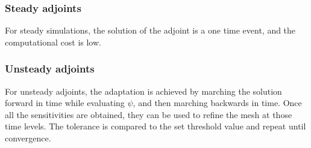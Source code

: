 \subsubsection{Steady adjoints}

For steady simulations, the solution of the adjoint is a one time event, and the computational cost is low.

\subsubsection{Unsteady adjoints}
For unsteady adjoints, the adaptation is achieved by marching the solution forward in time while evaluating $\psi$, and then marching backwards in time. Once all the sensitivities are obtained, they can be used to refine the mesh at those time levels. The tolerance is compared to the set threshold value and repeat until convergence.\par


